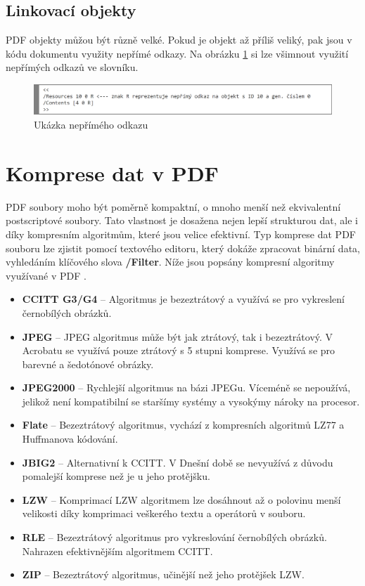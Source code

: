 \subsection{Linkovací objekty}
PDF objekty můžou být různě velké. Pokud je objekt až příliš veliký, pak jsou v kódu dokumentu využity nepřímé odkazy. Na obrázku \ref{fig:indirect_reference} si lze všimnout využití nepřímých odkazů ve slovníku. 
	\begin{figure}[h!]
	\centering
	\includegraphics[width=15cm]{img/pdf_indirect_reference}
	\caption{Ukázka nepřímého odkazu}
	\label{fig:indirect_reference}
	\end{figure}

\section{Komprese dat v PDF}
\label{sec:komprese}
PDF soubory moho být poměrně kompaktní, o mnoho menší než ekvivalentní postscriptové soubory. Tato vlastnost je dosažena nejen lepší strukturou dat, ale i díky kompresním algoritmům, které jsou velice efektivní. Typ komprese dat PDF souboru lze zjistit pomocí textového editoru, který dokáže zpracovat binární data, vyhledáním klíčového slova \textbf{/Filter}. Níže jsou popsány kompresní algoritmy využívané v PDF \cite{PDFPrepressure}.
\begin{itemize}
	\item \textbf{CCITT G3/G4} -- Algoritmus je bezeztrátový a využívá se pro vykreslení černobílých obrázků.
	\item \textbf{JPEG} -- JPEG algoritmus může být jak ztrátový, tak i bezeztrátový. V Acrobatu se využívá pouze ztrátový s 5 stupni komprese. Využívá se pro barevné a šedotónové obrázky.
	\item \textbf{JPEG2000} -- Rychlejší algoritmus na bázi JPEGu. Víceméně se nepoužívá, jelikož není kompatibilní se staršímy systémy a vysokýmy nároky na procesor.
	\item \textbf{Flate} -- Bezeztrátový algoritmus, vychází z kompresních algoritmů LZ77 a Huffmanova kódování.
	\item \textbf{JBIG2} -- Alternativní k CCITT. V Dnešní době se nevyužívá z důvodu pomalejší komprese než je u jeho protějšku.
	\item \textbf{LZW} -- Komprimací LZW algoritmem lze dosáhnout až o polovinu menší velikosti díky komprimaci veškerého textu a operátorů v souboru.
	\item \textbf{RLE} -- Bezeztrátový algoritmus pro vykreslování černobílých obrázků. Nahrazen efektivnějším algoritmem CCITT.
	\item \textbf{ZIP} -- Bezeztrátový algoritmus, učinější než jeho protějšek LZW.
\end{itemize}

